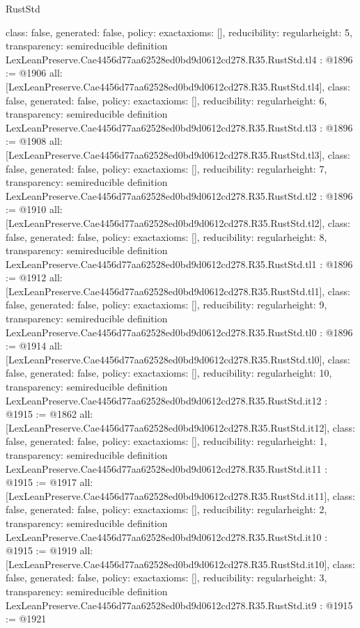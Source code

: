 \begin{lexlean}{RustStd}
\begin{coremodule}
{  class: false,
  generated: false,
  policy: exact{axioms: []},
  reducibility: regular{height: 5},
  transparency: semireducible
}
definition LexLeanPreserve.Cae4456d77aa62528ed0bd9d0612cd278.R35.RustStd.tl4 : @1896 := @1906 {
  all: [LexLeanPreserve.Cae4456d77aa62528ed0bd9d0612cd278.R35.RustStd.tl4],
  class: false,
  generated: false,
  policy: exact{axioms: []},
  reducibility: regular{height: 6},
  transparency: semireducible
}
definition LexLeanPreserve.Cae4456d77aa62528ed0bd9d0612cd278.R35.RustStd.tl3 : @1896 := @1908 {
  all: [LexLeanPreserve.Cae4456d77aa62528ed0bd9d0612cd278.R35.RustStd.tl3],
  class: false,
  generated: false,
  policy: exact{axioms: []},
  reducibility: regular{height: 7},
  transparency: semireducible
}
definition LexLeanPreserve.Cae4456d77aa62528ed0bd9d0612cd278.R35.RustStd.tl2 : @1896 := @1910 {
  all: [LexLeanPreserve.Cae4456d77aa62528ed0bd9d0612cd278.R35.RustStd.tl2],
  class: false,
  generated: false,
  policy: exact{axioms: []},
  reducibility: regular{height: 8},
  transparency: semireducible
}
definition LexLeanPreserve.Cae4456d77aa62528ed0bd9d0612cd278.R35.RustStd.tl1 : @1896 := @1912 {
  all: [LexLeanPreserve.Cae4456d77aa62528ed0bd9d0612cd278.R35.RustStd.tl1],
  class: false,
  generated: false,
  policy: exact{axioms: []},
  reducibility: regular{height: 9},
  transparency: semireducible
}
definition LexLeanPreserve.Cae4456d77aa62528ed0bd9d0612cd278.R35.RustStd.tl0 : @1896 := @1914 {
  all: [LexLeanPreserve.Cae4456d77aa62528ed0bd9d0612cd278.R35.RustStd.tl0],
  class: false,
  generated: false,
  policy: exact{axioms: []},
  reducibility: regular{height: 10},
  transparency: semireducible
}
definition LexLeanPreserve.Cae4456d77aa62528ed0bd9d0612cd278.R35.RustStd.it12 : @1915 := @1862 {
  all: [LexLeanPreserve.Cae4456d77aa62528ed0bd9d0612cd278.R35.RustStd.it12],
  class: false,
  generated: false,
  policy: exact{axioms: []},
  reducibility: regular{height: 1},
  transparency: semireducible
}
definition LexLeanPreserve.Cae4456d77aa62528ed0bd9d0612cd278.R35.RustStd.it11 : @1915 := @1917 {
  all: [LexLeanPreserve.Cae4456d77aa62528ed0bd9d0612cd278.R35.RustStd.it11],
  class: false,
  generated: false,
  policy: exact{axioms: []},
  reducibility: regular{height: 2},
  transparency: semireducible
}
definition LexLeanPreserve.Cae4456d77aa62528ed0bd9d0612cd278.R35.RustStd.it10 : @1915 := @1919 {
  all: [LexLeanPreserve.Cae4456d77aa62528ed0bd9d0612cd278.R35.RustStd.it10],
  class: false,
  generated: false,
  policy: exact{axioms: []},
  reducibility: regular{height: 3},
  transparency: semireducible
}
definition LexLeanPreserve.Cae4456d77aa62528ed0bd9d0612cd278.R35.RustStd.it9 : @1915 := @1921 {
}
\end{coremodule}
\end{lexlean}
